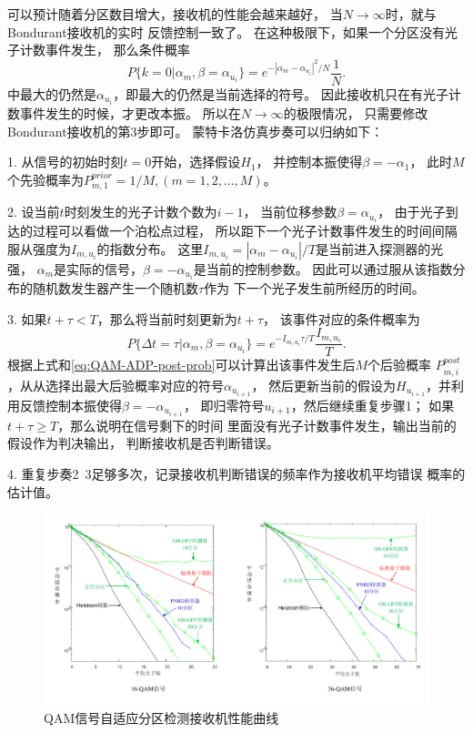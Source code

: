 可以预计随着分区数目增大，接收机的性能会越来越好，
当$N\rightarrow\infty$时，就与Bondurant接收机的实时
反馈控制一致了。
在这种极限下，如果一个分区没有光子计数事件发生，
那么条件概率
\begin{equation}
P\{k=0|\alpha_m, \beta=\alpha_{u_i}\} = e^{-|\alpha_m - \alpha_{u_i}|^2/N} \frac{1}{N}.
\end{equation}
中最大的仍然是$\alpha_{u_i}$，即最大的仍然是当前选择的符号。
因此接收机只在有光子计数事件发生的时候，才更改本振。
所以在$N\rightarrow\infty$的极限情况，
只需要修改Bondurant接收机的第3步即可。
蒙特卡洛仿真步奏可以归纳如下：

1. 从信号的初始时刻$t=0$开始，选择假设$H_1$，
   并控制本振使得$\beta=-\alpha_1$，
   此时$M$个先验概率为$P_{m,1}^{prior} = 1/M,(m=1,2,...,M)$。

2. 设当前$t$时刻发生的光子计数个数为$i-1$，
   当前位移参数$\beta = \alpha_{u_i}$，
   由于光子到达的过程可以看做一个泊松点过程，
   所以距下一个光子计数事件发生的时间间隔服从强度为$I_{m,u_i}$的指数分布\cite{hs2009sjgc}。
   这里$I_{m,u_i}=|\alpha_m-\alpha_{u_i}|/T$是当前进入探测器的光强，
   $\alpha_m$是实际的信号，$\beta = -\alpha_{u_i}$是当前的控制参数。
   因此可以通过服从该指数分布的随机数发生器产生一个随机数$\tau$作为
   下一个光子发生前所经历的时间。

3. 如果$t+\tau<T$，那么将当前时刻更新为$t + \tau$，
   该事件对应的条件概率为
   \begin{equation}
    P\{\Delta t = \tau|\alpha_m, \beta=\alpha_{u_i}\} = e^{-I_{m ,u_i}\tau/T} \frac{I_{m ,u_i}}{T}.
    \label{eq:QAM-ADP-cond-prob-2}
   \end{equation}
   根据上式和\ref{eq:QAM-ADP-post-prob}可以计算出该事件发生后$M$个后验概率
   $P_{m,i}^{post}$，从从选择出最大后验概率对应的符号$\alpha_{u_{i+1}}$，
   然后更新当前的假设为$H_{u_{i+1}}$，并利用反馈控制本振使得$\beta = -\alpha_{u_{i+1}}$，
   即归零符号$u_{i+1}$，然后继续重复步骤1；
   如果$t+\tau \ge T$，那么说明在信号剩下的时间
   里面没有光子计数事件发生，输出当前的假设作为判决输出，
   判断接收机是否判断错误。
   
4. 重复步奏2~3足够多次，记录接收机判断错误的频率作为接收机平均错误
   概率的估计值。
   

\begin{figure}
\centering
  \includegraphics[width=\textwidth]{figures/chap3/QAM-ADP-error}
  \caption{QAM信号自适应分区检测接收机性能曲线}
  \label{fig:QAM-ADP-error}
\end{figure}
 
